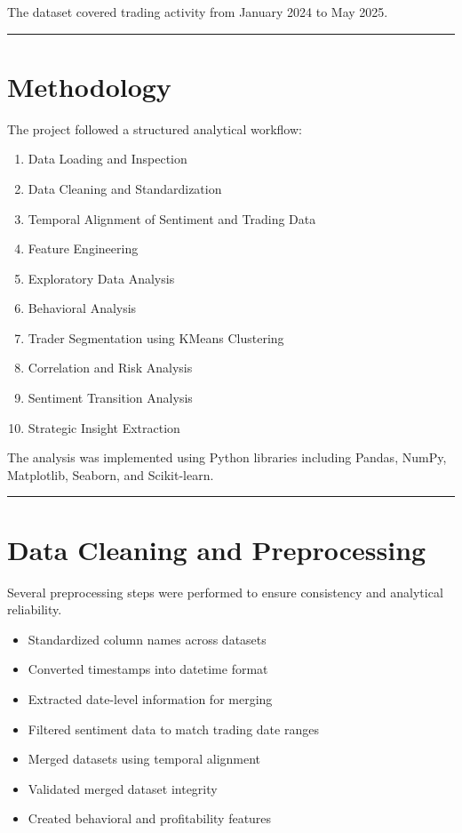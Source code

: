 \documentclass[11pt,a4paper]{article}
\begin{document}
The dataset covered trading activity from January 2024 to May 2025.


\vspace{0.5cm}
\hrule
\vspace{0.3cm}

\section{Methodology}

The project followed a structured analytical workflow:

\begin{enumerate}
    \item Data Loading and Inspection
    \item Data Cleaning and Standardization
    \item Temporal Alignment of Sentiment and Trading Data
    \item Feature Engineering
    \item Exploratory Data Analysis
    \item Behavioral Analysis
    \item Trader Segmentation using KMeans Clustering
    \item Correlation and Risk Analysis
    \item Sentiment Transition Analysis
    \item Strategic Insight Extraction
\end{enumerate}

The analysis was implemented using Python libraries including Pandas, NumPy, Matplotlib, Seaborn, and Scikit-learn.


\vspace{0.5cm}
\hrule
\vspace{0.3cm}

\section{Data Cleaning and Preprocessing}

Several preprocessing steps were performed to ensure consistency and analytical reliability.

\begin{itemize}
    \item Standardized column names across datasets
    \item Converted timestamps into datetime format
    \item Extracted date-level information for merging
    \item Filtered sentiment data to match trading date ranges
    \item Merged datasets using temporal alignment
    \item Validated merged dataset integrity
    \item Created behavioral and profitability features
\end{itemize}
\end{document}
